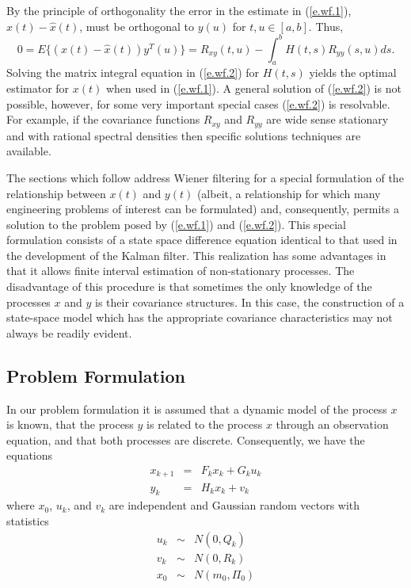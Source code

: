	By the principle of orthogonality the error 
in the estimate in (\ref{e.wf.1}), $x(t)-\hat{x}(t)$, must
be orthogonal to $y(u)$ for $t,u\in[a,b]$.  Thus,
%
\begin{equation}
0=E\{(x(t)-\hat{x}(t))y^T(u)\}=R_{xy}(t,u)-\int_{a}^{b}H(t,s)R_{yy}(s,u)ds.
\label{e.wf.2}
\end{equation}
%
Solving the matrix integral equation in (\ref{e.wf.2}) for $H(t,s)$ yields
the optimal estimator for $x(t)$ when used in (\ref{e.wf.1}).
A general solution of (\ref{e.wf.2}) is not possible, however,
for some very important special cases (\ref{e.wf.2}) is 
resolvable.  For example, if the covariance functions $R_{xy}$
and $R_{yy}$ are wide sense
stationary and with rational spectral densities then
specific solutions techniques are available.

	The sections which follow address Wiener filtering
for a special formulation of the relationship
between $x(t)$ and $y(t)$ (albeit, a relationship for which
many engineering problems of interest can be formulated) and,
consequently, permits a solution to the problem posed by 
(\ref{e.wf.1}) and (\ref{e.wf.2}).  This special formulation
consists of a state space difference equation identical to that
used in the development of the Kalman filter.  This realization
has some advantages in that it allows finite interval estimation
of non-stationary processes.  The disadvantage of this procedure
is that sometimes the only knowledge of the processes $x$ and $y$
is their covariance structures.  In this case, the construction of a 
state-space model which has the appropriate covariance 
characteristics may not always be readily evident.

\subsection{Problem Formulation}

	In our problem formulation it is assumed
that a dynamic model of the process $x$ is known,
that the process $y$ is related to the process $x$
through an observation equation, and that both
processes are discrete.  Consequently, we have 
the equations
%
\begin{eqnarray}
x_{k+1}&=&F_kx_k+G_ku_k\nonumber\\
y_k&=&H_kx_k+v_k
\label{e.wf.3}
\end{eqnarray}
%
where $x_0$, $u_k$, and $v_k$ are independent and Gaussian
random vectors with statistics
%
\begin{eqnarray}
u_k&\sim&N(0,Q_k)\nonumber\\
v_k&\sim&N(0,R_k)\nonumber\\
x_0&\sim&N(m_0,\Pi_0)\nonumber\\
\label{e.wf.4}
\end{eqnarray}
%

